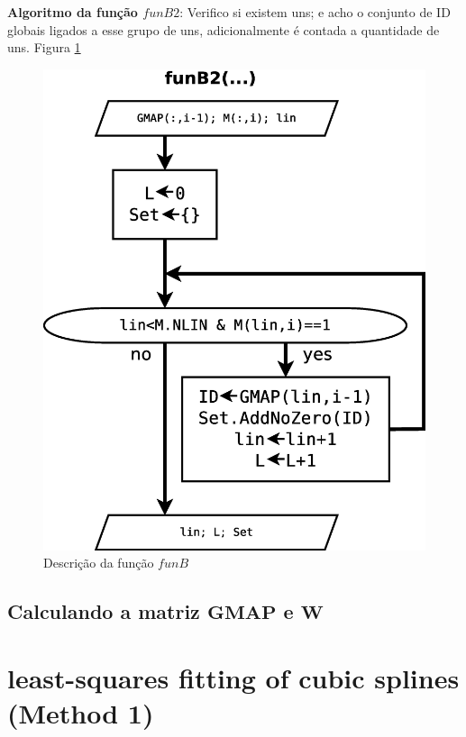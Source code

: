 \documentclass[a4paper,10pt]{article}
\begin{document}
\textbf{Algoritmo da função $funB2$}:
Verifico si existem uns; e acho o conjunto de ID globais ligados a esse grupo de uns,
adicionalmente é contada a quantidade de uns.
Figura \ref{fig:funB2}
\begin{figure}[!htb]
\centering
\includegraphics[scale=0.25]{funB2.eps}
\caption{Descrição da função $funB$ }
\label{fig:funB2}
\end{figure}

\subsection{Calculando a matriz $\mathbf{GMAP}$ e $\mathbf{W}$}

\section{least-squares fitting of cubic splines (Method 1)}
\label{sec:spline3method1}
\end{document}
